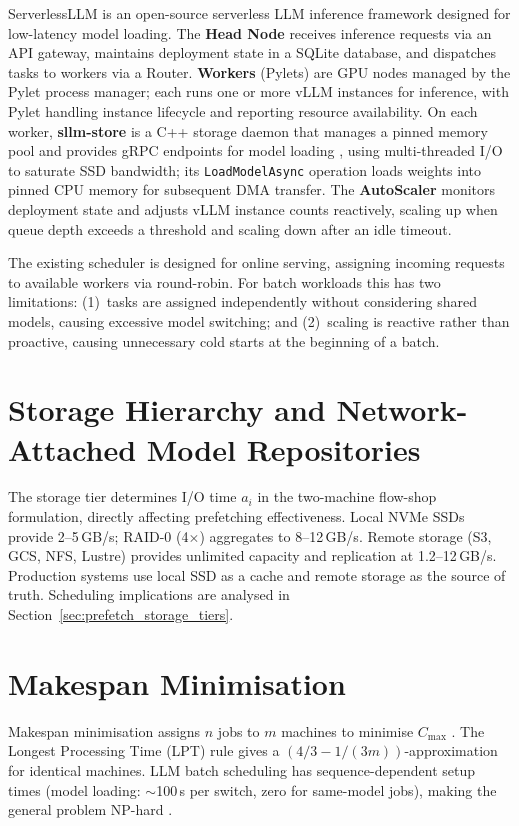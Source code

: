 \documentclass[logo,bsc,singlespacing,parskip,online]{infthesis}
\begin{document}
ServerlessLLM \citep{fu2024serverlessllm} is an open-source serverless LLM inference framework designed for low-latency model loading. The \textbf{Head Node} receives inference requests via an API gateway, maintains deployment state in a SQLite database, and dispatches tasks to workers via a Router. \textbf{Workers} (Pylets) are GPU nodes managed by the Pylet process manager; each runs one or more vLLM \citep{kwon2023efficient} instances for inference, with Pylet handling instance lifecycle and reporting resource availability. On each worker, \textbf{sllm-store} is a C++ storage daemon that manages a pinned memory pool and provides gRPC endpoints for model loading \citep{grpc2024}, using multi-threaded I/O to saturate SSD bandwidth; its \texttt{LoadModelAsync} operation loads weights into pinned CPU memory for subsequent DMA transfer. The \textbf{AutoScaler} monitors deployment state and adjusts vLLM instance counts reactively, scaling up when queue depth exceeds a threshold and scaling down after an idle timeout.

The existing scheduler is designed for online serving, assigning incoming requests to available workers via round-robin. For batch workloads this has two limitations: (1)~tasks are assigned independently without considering shared models, causing excessive model switching; and (2)~scaling is reactive rather than proactive, causing unnecessary cold starts at the beginning of a batch.

\section{Storage Hierarchy and Network-Attached Model Repositories}
\label{sec:bg_storage_hierarchy}

The storage tier determines I/O time $a_i$ in the two-machine flow-shop formulation, directly affecting prefetching effectiveness. Local NVMe SSDs provide 2--5\,GB/s; RAID-0 (4$\times$) aggregates to 8--12\,GB/s. Remote storage (S3, GCS, NFS, Lustre) provides unlimited capacity and replication at 1.2--12\,GB/s. Production systems use local SSD as a cache and remote storage as the source of truth. Scheduling implications are analysed in Section~\ref{sec:prefetch_storage_tiers}.

\section{Makespan Minimisation}
\label{sec:bg_makespan}

Makespan minimisation assigns $n$ jobs to $m$ machines to minimise $C_{\max}$ \citep{pinedo2016scheduling}. The Longest Processing Time (LPT) rule \citep{graham1966bounds} gives a $(4/3 - 1/(3m))$-approximation for identical machines. LLM batch scheduling has sequence-dependent setup times (model loading: $\sim$100\,s per switch, zero for same-model jobs), making the general problem NP-hard \citep{pinedo2016scheduling}.
\end{document}
